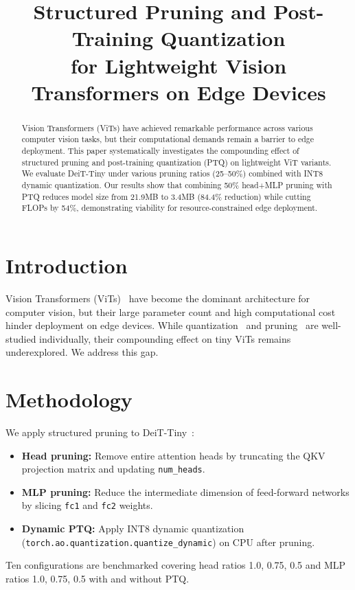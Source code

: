 \documentclass[conference]{IEEEtran}
\title{Structured Pruning and Post-Training Quantization\\for Lightweight Vision Transformers on Edge Devices}
\author{
    \IEEEauthorblockN{Fatih\IEEEauthorrefmark{1},
    Oddy Virgantara Putra\IEEEauthorrefmark{2}}
    \IEEEauthorblockA{
        \IEEEauthorrefmark{1}Informatics Department, ...
    }
}
\begin{document}
\maketitle

\begin{abstract}
Vision Transformers (ViTs) have achieved remarkable performance across
various computer vision tasks, but their computational demands remain a
barrier to edge deployment. This paper systematically investigates the
compounding effect of structured pruning and post-training quantization
(PTQ) on lightweight ViT variants. We evaluate DeiT-Tiny under various
pruning ratios (25--50\%) combined with INT8 dynamic quantization. Our
results show that combining 50\% head+MLP pruning with PTQ reduces model
size from 21.9MB to 3.4MB (84.4\% reduction) while cutting FLOPs by 54\%,
demonstrating viability for resource-constrained edge deployment.
\end{abstract}

\section{Introduction}
Vision Transformers (ViTs)~\cite{dosovitskiy2020vit} have become the dominant
architecture for computer vision, but their large parameter count and high
computational cost hinder deployment on edge devices. While
quantization~\cite{quant2022pytorch} and pruning~\cite{zhu2023pruning} are
well-studied individually, their compounding effect on tiny ViTs remains
underexplored. We address this gap.

\section{Methodology}
We apply structured pruning to DeiT-Tiny~\cite{touvron2021deit}:
\begin{itemize}
    \item \textbf{Head pruning:} Remove entire attention heads by
    truncating the QKV projection matrix and updating \texttt{num\_heads}.
    \item \textbf{MLP pruning:} Reduce the intermediate dimension of
    feed-forward networks by slicing \texttt{fc1} and \texttt{fc2} weights.
    \item \textbf{Dynamic PTQ:} Apply INT8 dynamic quantization
    (\texttt{torch.ao.quantization.quantize\_dynamic}) on CPU after pruning.
\end{itemize}
Ten configurations are benchmarked covering head ratios 1.0, 0.75, 0.5
and MLP ratios 1.0, 0.75, 0.5 with and without PTQ.
\end{document}
